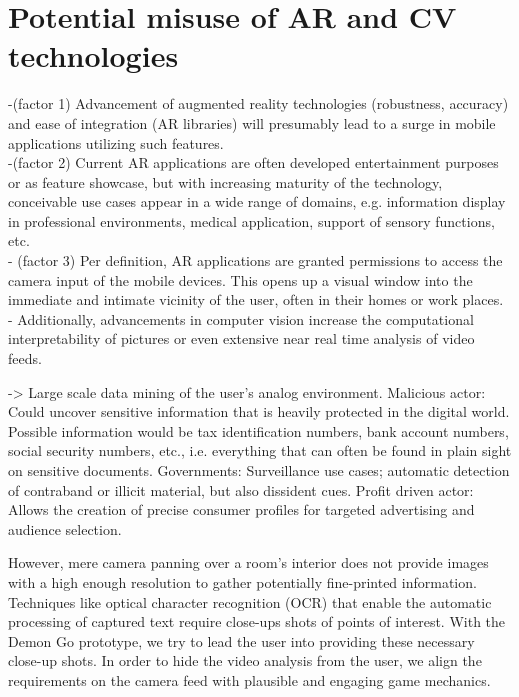 
\section{Potential misuse of AR and CV technologies}

-(factor 1) Advancement of augmented reality technologies (robustness, accuracy) and ease of integration (AR libraries) will presumably lead to a surge in mobile applications utilizing such features. \\
-(factor 2) Current AR applications are often developed entertainment purposes or as feature showcase, but with increasing maturity of the technology, conceivable use cases appear in a wide range of domains, e.g. information display in professional environments, medical application, support of sensory functions, etc. \\
- (factor 3) Per definition, AR applications are granted permissions to access the camera input of the mobile devices. This opens up a visual window into the immediate and intimate vicinity of the user, often in their homes or work places. \\
- Additionally, advancements in computer vision increase the computational interpretability of pictures or even extensive near real time analysis of video feeds.

-> Large scale data mining of the user's analog environment.
Malicious actor: Could uncover sensitive information that is heavily protected in the digital world.
Possible information would be tax identification numbers, bank account numbers, social security numbers, etc., i.e. everything that can often be found in plain sight on sensitive documents.
Governments: Surveillance use cases; automatic detection of contraband or illicit material, but also dissident cues.
Profit driven actor: Allows the creation of precise consumer profiles for targeted advertising and audience selection.

However, mere camera panning over a room's interior does not provide images with a high enough resolution to gather potentially fine-printed information.
Techniques like optical character recognition (OCR) that enable the automatic processing of captured text require close-ups shots of points of interest.
With the Demon Go prototype, we try to lead the user into providing these necessary close-up shots.
In order to hide the video analysis from the user, we align the requirements on the camera feed with plausible and engaging game mechanics.

